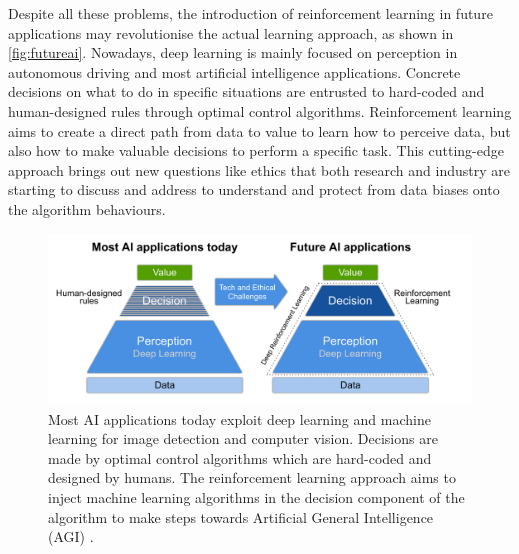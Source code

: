 Despite all these problems, the introduction of reinforcement learning in future applications may revolutionise the actual learning approach, as shown in \vref{fig:futureai}.
Nowadays, deep learning is mainly focused on perception in autonomous driving and most artificial intelligence applications.
Concrete decisions on what to do in specific situations are entrusted to hard-coded and human-designed rules through optimal control algorithms.
Reinforcement learning aims to create a direct path from data to value to learn how to perceive data, but also how to make valuable decisions to perform a specific task.
This cutting-edge approach brings out new questions like ethics that both research and industry are starting to discuss and address to understand and protect from data biases onto the algorithm behaviours.



\begin{figure}[ht!]
	\centering
	\includegraphics[width=\textwidth]{img/reinforcement-learning.png}
	\caption[Future transition in AI Applications]{Most AI applications today exploit deep learning and machine learning for image detection and computer vision.
		Decisions are made by optimal control algorithms which are hard-coded and designed by humans.
		The reinforcement learning approach aims to inject machine learning algorithms in the decision component of the algorithm to make steps towards Artificial General Intelligence (AGI) \cite{chara2018wild}.}
	\label{fig:futureai}
\end{figure}

